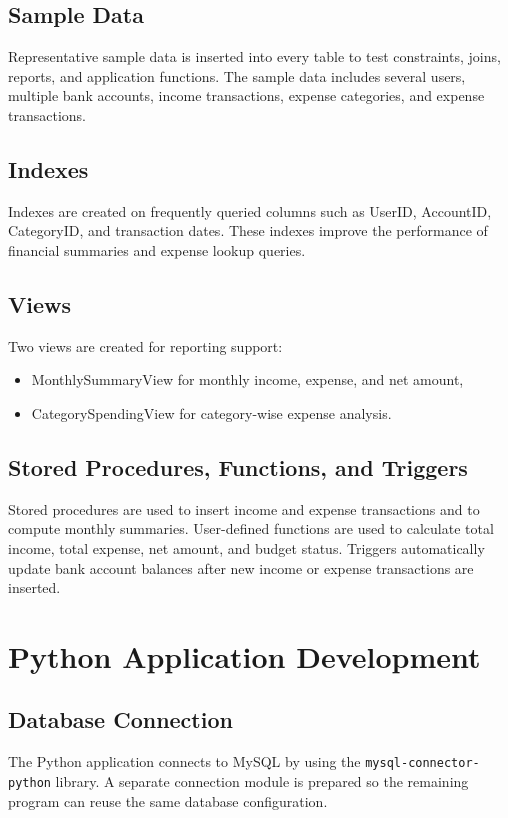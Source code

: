 \subsection{Sample Data}
Representative sample data is inserted into every table to test constraints, joins, reports, and application functions. The sample data includes several users, multiple bank accounts, income transactions, expense categories, and expense transactions.

\subsection{Indexes}
Indexes are created on frequently queried columns such as UserID, AccountID, CategoryID, and transaction dates. These indexes improve the performance of financial summaries and expense lookup queries.

\subsection{Views}
Two views are created for reporting support:
\begin{itemize}
    \item MonthlySummaryView for monthly income, expense, and net amount,
    \item CategorySpendingView for category-wise expense analysis.
\end{itemize}

\subsection{Stored Procedures, Functions, and Triggers}
Stored procedures are used to insert income and expense transactions and to compute monthly summaries. User-defined functions are used to calculate total income, total expense, net amount, and budget status. Triggers automatically update bank account balances after new income or expense transactions are inserted.

\section{Python Application Development}

\subsection{Database Connection}
The Python application connects to MySQL by using the \texttt{mysql-connector-python} library. A separate connection module is prepared so the remaining program can reuse the same database configuration.

